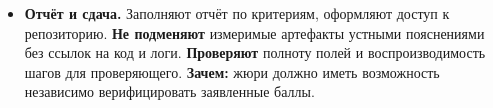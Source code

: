 \begin{itemize}
  \item \textbf{Отчёт и сдача.} Заполняют отчёт по критериям, оформляют доступ к репозиторию. \textbf{Не подменяют} измеримые артефакты устными пояснениями без ссылок на код и логи. \textbf{Проверяют} полноту полей и воспроизводимость шагов для проверяющего. \textbf{Зачем:} жюри должно иметь возможность независимо верифицировать заявленные баллы.
\end{itemize}
